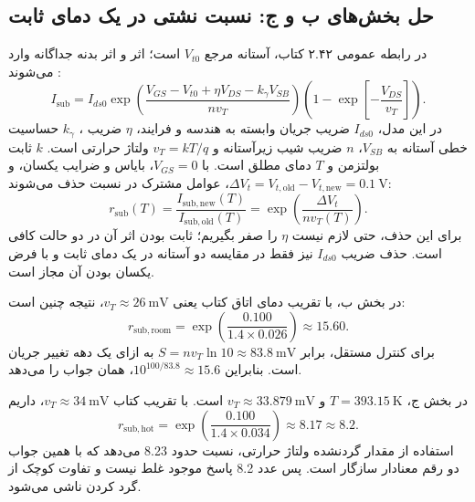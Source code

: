 \documentclass[12pt,a4paper]{article}
\newcommand{\exnum}[1]{\mbox{\beginL#1\endL}}
\begin{document}
\subsection*{حل بخش‌های ب و ج: نسبت نشتی در یک دمای ثابت}
در رابطه عمومی \exnum{۲.۴۲} کتاب، آستانه مرجع \(V_{t0}\) است؛ اثر  و اثر بدنه جداگانه وارد می‌شوند \cite[صفحات چاپی ۸۱ و ۸۲، صفحات ۱۰۸ و ۱۰۹ فایل]{weste}\cite[اسلاید ۲۳]{nonideal}:
\begin{equation}
 I_{\mathrm{sub}}=I_{ds0}
 \exp\!\left(\frac{V_{GS}-V_{t0}+\eta V_{DS}-k_\gamma V_{SB}}{nv_T}\right)
 \left(1-\exp\!\left[-\frac{V_{DS}}{v_T}\right]\right).
 \label{eq:subthreshold}
\end{equation}
در این مدل، \(I_{ds0}\) ضریب جریان وابسته به هندسه و فرایند، \(\eta\) ضریب ، \(k_\gamma\) حساسیت خطی آستانه به \(V_{SB}\)، \(n\) ضریب شیب زیرآستانه و \(v_T=kT/q\) ولتاژ حرارتی است. \(k\) ثابت بولتزمن و \(T\) دمای مطلق است. با \(V_{GS}=0\)، بایاس و ضرایب یکسان، و \(\Delta V_t=V_{t,\mathrm{old}}-V_{t,\mathrm{new}}=\qty{0.1}{\volt}\)، عوامل مشترک در نسبت حذف می‌شوند:
\begin{equation}
 r_{\mathrm{sub}}(T)=
 \frac{I_{\mathrm{sub,new}}(T)}{I_{\mathrm{sub,old}}(T)}
 =\exp\!\left(\frac{\Delta V_t}{nv_T(T)}\right).
 \label{eq:leak-ratio}
\end{equation}
برای این حذف، حتی لازم نیست \(\eta\) را صفر بگیریم؛ ثابت بودن اثر آن در دو حالت کافی است. حذف ضریب \(I_{ds0}\) نیز فقط در مقایسه دو آستانه در یک دمای ثابت و با فرض یکسان بودن آن مجاز است.

در بخش ب، با تقریب دمای اتاق کتاب یعنی \(v_T\approx\qty{26}{\milli\volt}\)، نتیجه چنین است:
\begin{equation}
 r_{\mathrm{sub,room}}=
 \exp\!\left(\frac{0.100}{1.4\times0.026}\right)
 \approx15.60.
 \label{eq:leak-room}
\end{equation}
برای کنترل مستقل،  برابر \(S=nv_T\ln10\approx\qty{83.8}{\milli\volt}\) به ازای یک دهه تغییر جریان است. بنابراین \(10^{100/83.8}\approx15.6\)، همان جواب را می‌دهد.

در بخش ج، \(T=\qty{393.15}{\kelvin}\) و \(v_T\approx\qty{33.879}{\milli\volt}\) است. با تقریب کتاب \(v_T\approx\qty{34}{\milli\volt}\)، داریم
\begin{equation}
 r_{\mathrm{sub,hot}}=
 \exp\!\left(\frac{0.100}{1.4\times0.034}\right)
 \approx8.17\approx8.2.
 \label{eq:leak-hot}
\end{equation}
استفاده از مقدار گردنشده ولتاژ حرارتی، نسبت حدود \num{8.23} می‌دهد که با همین جواب دو رقم معنادار سازگار است. پس عدد \num{8.2} پاسخ موجود غلط نیست و تفاوت کوچک از گرد کردن ناشی می‌شود.
\end{document}
